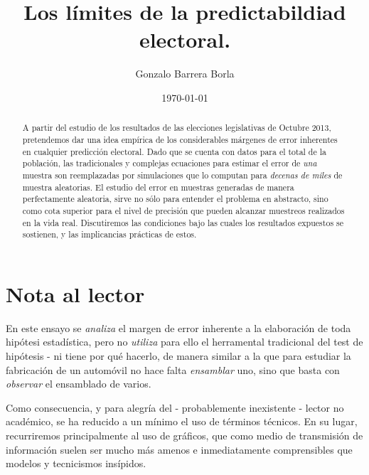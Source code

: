 \documentclass[12pt, a4paper]{article}
\begin{document}
\title{Los l\'imites de la predictabildiad electoral.}
\author{Gonzalo Barrera Borla}
\date{\today}

\maketitle

\pagebreak

\begin{abstract}
	A partir del estudio de los resultados de las elecciones legislativas de Octubre 2013, pretendemos dar una idea emp\'irica de los considerables m\'argenes de error inherentes en cualquier predicci\'on electoral. Dado que se cuenta con datos para el total de la poblaci\'on, las tradicionales y complejas ecuaciones para estimar el error de \emph{una} muestra son reemplazadas por simulaciones que lo computan para \emph{decenas de miles} de muestra aleatorias.
	El estudio del error en muestras generadas de manera perfectamente aleatoria, sirve no s\'olo para entender el problema en abstracto, sino como cota superior para el nivel de precisi\'on que pueden alcanzar muestreos realizados en la vida real. Discutiremos las condiciones bajo las cuales los resultados expuestos se sostienen, y las implicancias pr\'acticas de estos.
\end{abstract}

\pagebreak

\tableofcontents

\pagebreak

\section{Nota al lector}

En este ensayo se \emph{analiza} el margen de error inherente a la elaboraci\'on de toda hip\'otesi estad\'istica, pero no \emph{utiliza} para ello el herramental tradicional del test de hip\'otesis - ni tiene por qu\'e hacerlo, de manera similar a la que para estudiar la fabricaci\'on de un autom\'ovil no hace falta \emph{ensamblar} uno, sino que basta con \emph{observar} el ensamblado de varios.

Como consecuencia, y para alegr\'ia del - probablemente inexistente - lector no acad\'emico, se ha reducido a un m\'inimo el uso de t\'erminos t\'ecnicos. En su lugar, recurriremos principalmente al uso de gr\'aficos, que como medio de transmisi\'on de informaci\'on suelen ser mucho m\'as amenos e inmediatamente comprensibles que modelos y tecnicismos ins\'ipidos.
\end{document}
